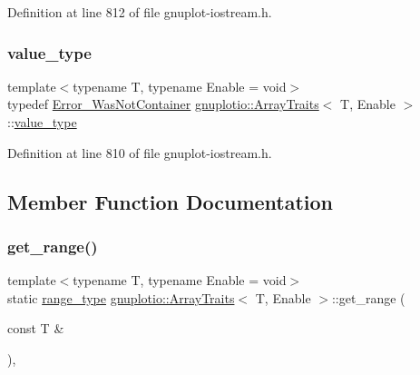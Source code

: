 Definition at line 812 of file gnuplot-\/iostream.\+h.

\mbox{\label{classgnuplotio_1_1_array_traits_a3bcae12a7bf42af90f4946acc66f27e0}} 
\subsubsection{\texorpdfstring{value\+\_\+type}{value\_type}}
{\footnotesize\ttfamily template$<$typename T, typename Enable = void$>$ \\
typedef \hyperlink{structgnuplotio_1_1_error___was_not_container}{Error\+\_\+\+Was\+Not\+Container} \hyperlink{classgnuplotio_1_1_array_traits}{gnuplotio\+::\+Array\+Traits}$<$ T, Enable $>$\+::\hyperlink{classgnuplotio_1_1_array_traits_a3bcae12a7bf42af90f4946acc66f27e0}{value\+\_\+type}}



Definition at line 810 of file gnuplot-\/iostream.\+h.



\subsection{Member Function Documentation}
\mbox{\label{classgnuplotio_1_1_array_traits_aee31432f330f9f9e4f5af628641181f7}} 
\subsubsection{\texorpdfstring{get\+\_\+range()}{get\_range()}}
{\footnotesize\ttfamily template$<$typename T, typename Enable = void$>$ \\
static \hyperlink{classgnuplotio_1_1_array_traits_ae53464a5175c03deec403392b8dcb3c5}{range\+\_\+type} \hyperlink{classgnuplotio_1_1_array_traits}{gnuplotio\+::\+Array\+Traits}$<$ T, Enable $>$\+::get\+\_\+range (\begin{DoxyParamCaption}\item[{const T \&}]{ }\end{DoxyParamCaption})\hspace{0.3cm}{\ttfamily [inline]}, {\ttfamily [static]}}




